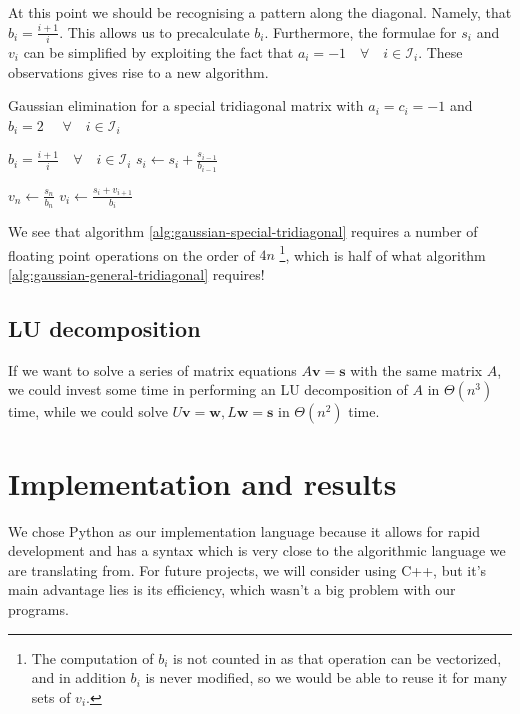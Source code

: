 \documentclass[a4paper]{article}
\begin{document}
At this point we should be recognising a pattern along the diagonal. Namely, that $b_i = \frac{i+1}{i}$. This allows us to precalculate $b_i$. Furthermore, the formulae for $s_i$ and $v_i$ can be simplified by exploiting the fact that $a_i = -1 \quad \forall \quad i \in \mathcal{I}_i$.
These observations gives rise to a new algorithm.

\begin{algorithm}
\caption{Gaussian elimination for a special tridiagonal matrix with $a_i = c_i = -1$ and $b_i = 2$ $\quad \forall \quad i \in \mathcal{I}_i$} \label{alg:gaussian-special-tridiagonal}
\begin{algorithmic}[1]
  \Require $b_i = \frac{i+1}{i} \quad \forall \quad i \in \mathcal{I}_i$
   
    \State $s_i \gets s_i + \frac{s_{i-1}}{b_{i-1}}$ 
  \EndFor

  \Statex {}
  \State $v_n \gets \frac{s_n}{b_n}$
    \State $v_i \gets \frac{s_i + v_{i+1}}{b_i}$
  \EndFor
\end{algorithmic}
\end{algorithm}

We see that algorithm \ref{alg:gaussian-special-tridiagonal} requires a number of floating point operations on the order of $4n$ \footnote{The computation of $b_i$ is not counted in as that operation can be vectorized, and in addition $b_i$ is never modified, so we would be able to reuse it for many sets of $v_i$.}, which is half of what algorithm \ref{alg:gaussian-general-tridiagonal} requires!

\subsection{LU decomposition}
\label{sec:lu}
If we want to solve a series of matrix equations $A\mathbf{v} = \mathbf{s}$ with the same matrix $A$, we could invest some time in performing an LU decomposition of $A$ in $\Theta(n^3)$ time, while we could solve $U\mathbf{v} = \mathbf{w}, L\mathbf{w} = \mathbf{s}$ in $\Theta(n^2)$ time.

\section{Implementation and results}\label{sec:implementation_and_results}
We chose Python as our implementation language because it allows for rapid development and has a syntax which is very close to the algorithmic language we are translating from. For future projects, we will consider using C++, but it's main advantage lies is its efficiency, which wasn't a big problem with our programs.
\end{document}
